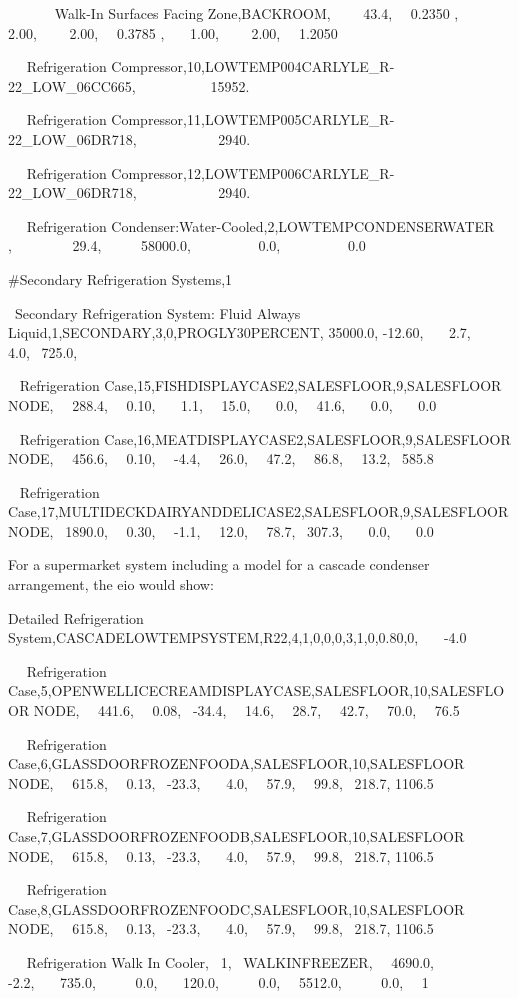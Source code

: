 ~~~~~~ Walk-In Surfaces Facing Zone,BACKROOM,~~~~ 43.4,~~ 0.2350 ,~~~ 2.00,~~~~ 2.00,~~ 0.3785 ,~~~ 1.00,~~~~ 2.00,~~ 1.2050

~~ Refrigeration Compressor,10,LOWTEMP004CARLYLE\_R-22\_LOW\_06CC665,~~~~~~~~~~ 15952.

~~ Refrigeration Compressor,11,LOWTEMP005CARLYLE\_R-22\_LOW\_06DR718,~~~~~~~~~~~ 2940.

~~ Refrigeration Compressor,12,LOWTEMP006CARLYLE\_R-22\_LOW\_06DR718,~~~~~~~~~~~ 2940.

~~ Refrigeration Condenser:Water-Cooled,2,LOWTEMPCONDENSERWATER~ ,~~~~~~~~ 29.4,~~~~~ 58000.0,~~~~~~~~~ 0.0,~~~~~~~~~ 0.0

\#Secondary Refrigeration Systems,1

~Secondary Refrigeration System: Fluid Always Liquid,1,SECONDARY,3,0,PROGLY30PERCENT, 35000.0, -12.60,~~~ 2.7,~~~ 4.0,~ 725.0,

~ Refrigeration Case,15,FISHDISPLAYCASE2,SALESFLOOR,9,SALESFLOOR NODE,~~ 288.4,~~ 0.10,~~~ 1.1,~~ 15.0,~~~ 0.0,~~ 41.6,~~~ 0.0,~~~ 0.0

~ Refrigeration Case,16,MEATDISPLAYCASE2,SALESFLOOR,9,SALESFLOOR NODE,~~ 456.6,~~ 0.10,~~ -4.4,~~ 26.0,~~ 47.2,~~ 86.8,~~ 13.2,~ 585.8

~ Refrigeration Case,17,MULTIDECKDAIRYANDDELICASE2,SALESFLOOR,9,SALESFLOOR NODE,~ 1890.0,~~ 0.30,~~ -1.1,~~ 12.0,~~ 78.7,~ 307.3,~~~ 0.0,~~~ 0.0

For a supermarket system including a model for a cascade condenser arrangement, the eio would show:

Detailed Refrigeration System,CASCADELOWTEMPSYSTEM,R22,4,1,0,0,0,3,1,0,0.80,0,~~~ -4.0

~~ Refrigeration Case,5,OPENWELLICECREAMDISPLAYCASE,SALESFLOOR,10,SALESFLOOR NODE,~~ 441.6,~~ 0.08,~ -34.4,~~ 14.6,~~ 28.7,~~ 42.7,~~ 70.0,~~ 76.5

~~ Refrigeration Case,6,GLASSDOORFROZENFOODA,SALESFLOOR,10,SALESFLOOR NODE,~~ 615.8,~~ 0.13,~ -23.3,~~~ 4.0,~~ 57.9,~~ 99.8,~ 218.7, 1106.5

~~ Refrigeration Case,7,GLASSDOORFROZENFOODB,SALESFLOOR,10,SALESFLOOR NODE,~~ 615.8,~~ 0.13,~ -23.3,~~~ 4.0,~~ 57.9,~~ 99.8,~ 218.7, 1106.5

~~ Refrigeration Case,8,GLASSDOORFROZENFOODC,SALESFLOOR,10,SALESFLOOR NODE,~~ 615.8,~~ 0.13,~ -23.3,~~~ 4.0,~~ 57.9,~~ 99.8,~ 218.7, 1106.5

~~ Refrigeration Walk In Cooler,~ 1,~ WALKINFREEZER,~~ 4690.0,~~~~ -2.2,~~~ 735.0,~~~~~ 0.0,~~~ 120.0,~~~~~ 0.0,~~ 5512.0,~~~~~ 0.0,~~ 1


